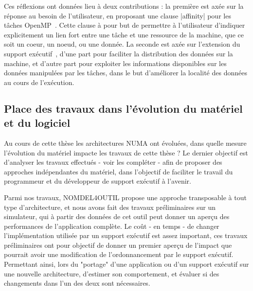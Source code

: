 Ces réflexions ont données lieu à deux contributions : la première est axée sur la réponse au besoin de l'utilisateur, en proposant une clause |affinity| pour les tâches OpenMP~\cite{Virouleau2016b}. Cette clause à pour but de permettre à l'utilisateur d'indiquer explicitement un lien fort entre une tâche et une ressource de la machine, que ce soit un coeur, un noeud, ou une donnée.
La seconde est axée sur l'extension du support exécutif~\cite{Virouleau2016a}, d'une part pour faciliter la distribution des données sur la machine, et d'autre part pour exploiter les informations disponibles sur les données manipulées par les tâches, dans le but d'améliorer la localité des données au cours de l'exécution.


\subsection*{Place des travaux dans l'évolution du matériel et du logiciel}

Au cours de cette thèse les architectures NUMA ont évoluées, dans quelle mesure l'évolution du matériel impacte les travaux de cette thèse ?
Le dernier objectif est d'analyser les travaux effectués - voir les compléter - afin de proposer des approches indépendantes du matériel, dans l'objectif de faciliter le travail du programmeur et du développeur de support exécutif à l'avenir.

Parmi nos travaux, NOMDEL4OUTIL propose une approche transposable à tout type d'architecture, et nous avons fait des travaux préliminaires sur un simulateur, qui à partir des données de cet outil peut donner un aperçu des performances de l'application complète.
Le coût - en temps - de changer l'implémentation utilisée par un support exécutif est assez important, ces travaux préliminaires ont pour objectif de donner un premier aperçu de l'impact que pourrait avoir une modification de l'ordonnancement par le support exécutif.
Permettant ainsi, lors du "portage" d'une application ou d'un support exécutif sur une nouvelle architecture, d'estimer son comportement, et évaluer si des changements dans l'un des deux sont nécessaires.
